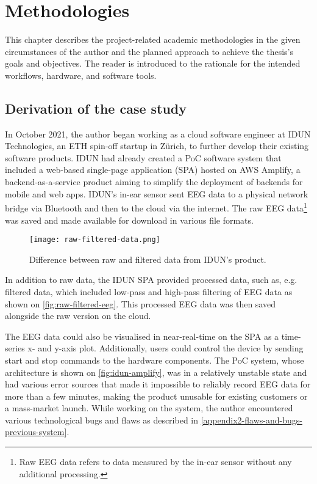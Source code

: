 \chapter{Methodologies}
\graphicspath{{Chapter3/Figs/}{Chapter3/Figs/}}

This chapter describes the project-related academic methodologies in the given circumstances of the author and the planned approach to achieve the thesis's goals and objectives. The reader is introduced to the rationale for the intended workflows, hardware, and software tools.

\section{Derivation of the case study}
\label{chapter3-derivation-of-the-case-study}

In October 2021, the author began working as a cloud software engineer at IDUN Technologies, an ETH spin-off startup in Zürich, to further develop their existing software products. IDUN had already created a PoC software system that included a web-based single-page application (SPA) hosted on AWS Amplify, a backend-as-a-service product aiming to simplify the deployment of backends for mobile and web apps. IDUN's in-ear sensor sent EEG data to a physical network bridge via Bluetooth and then to the cloud via the internet. The raw EEG data\footnote{Raw EEG data refers to data measured by the in-ear sensor without any additional processing.} was saved and made available for download in various file formats.

\begin{figure}[!ht]
  \centering
  \texttt{[image: raw-filtered-data.png]}
  \caption{Difference between raw and filtered data from IDUN's product.}
  \label{fig:raw-filtered-eeg}
\end{figure}

In addition to raw data, the IDUN SPA provided processed data, such as, e.g. filtered data, which included low-pass and high-pass filtering of EEG data as shown on \autoref{fig:raw-filtered-eeg}. This processed EEG data was then saved alongside the raw version on the cloud.

The EEG data could also be visualised in near-real-time on the SPA as a time-series x- and y-axis plot. Additionally, users could control the device by sending start and stop commands to the hardware components. The PoC system, whose architecture is shown on \autoref{fig:idun-amplify}, was in a relatively unstable state and had various error sources that made it impossible to reliably record EEG data for more than a few minutes, making the product unusable for existing customers or a mass-market launch. While working on the system, the author encountered various technological bugs and flaws as described in \autoref{appendix2-flaws-and-bugs-previous-system}.

